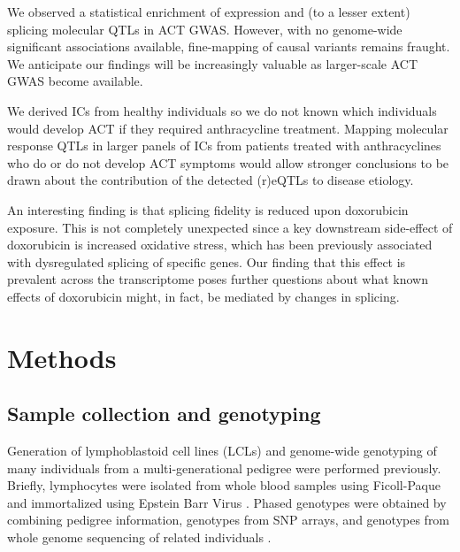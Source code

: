 \documentclass{article}
\begin{document}
We observed a statistical enrichment of expression and (to a lesser extent) splicing molecular QTLs in ACT GWAS. However, with no genome-wide significant associations available, fine-mapping of causal variants remains fraught. We anticipate our findings will be increasingly valuable as larger-scale ACT GWAS become available. 

We derived ICs from healthy individuals so we do not known which individuals would develop ACT if they required anthracycline treatment. Mapping molecular response QTLs in larger panels of ICs from patients treated with anthracyclines who do or do not develop ACT symptoms would allow stronger conclusions to be drawn about the contribution of the detected (r)eQTLs to disease etiology. 

An interesting finding is that splicing fidelity is reduced upon doxorubicin exposure. This is not completely unexpected since a key downstream side-effect of doxorubicin is increased oxidative stress, which has been previously associated with dysregulated splicing of specific genes\cite{Disher2007,Seo2016}. Our finding that this effect is prevalent across the transcriptome poses further questions about what known effects of  doxorubicin might, in fact, be mediated by changes in splicing. 


\section*{Methods} 

\subsection*{Sample collection and genotyping}

Generation of lymphoblastoid cell lines (LCLs) and genome-wide genotyping of
many individuals from a multi-generational pedigree were performed
previously. Briefly, lymphocytes were isolated from whole blood samples using
Ficoll-Paque and immortalized using Epstein Barr Virus \cite{Cusanovich2012,
Cusanovich2016}. Phased genotypes were obtained by combining pedigree
information, genotypes from SNP arrays, and genotypes from whole genome
sequencing of related individuals \cite{Livne2015}.
\end{document}
